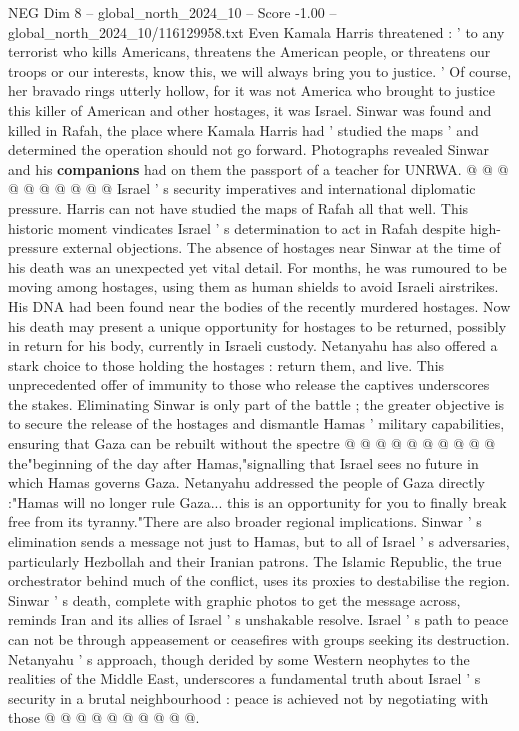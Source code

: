 \begin{textsample}{NEG Dim 8 – global\_north\_2024\_10 – Score -1.00 – global\_north\_2024\_10/116129958.txt}
Even Kamala Harris threatened : ' to any terrorist who kills Americans, threatens the American people, or threatens our troops or our interests, know this, we will always bring you to justice. ' Of course, her bravado rings utterly hollow, for it was not America who brought to justice this killer of American and other hostages, it was Israel.
Sinwar was found and killed in Rafah, the place where Kamala Harris had ' studied the maps ' and determined the operation should not go forward.
Photographs revealed Sinwar and his \textbf{companions} had on them the passport of a teacher for UNRWA. @ @ @ @ @ @ @ @ @ @ Israel ' s security imperatives and international diplomatic pressure.
Harris can not have studied the maps of Rafah all that well.
This historic moment vindicates Israel ' s determination to act in Rafah despite high-pressure external objections.
The absence of hostages near Sinwar at the time of his death was an unexpected yet vital detail.
For months, he was rumoured to be moving among hostages, using them as human shields to avoid Israeli airstrikes.
His DNA had been found near the bodies of the recently murdered hostages.
Now his death may present a unique opportunity for hostages to be returned, possibly in return for his body, currently in Israeli custody.
Netanyahu has also offered a stark choice to those holding the hostages : return them, and live.
This unprecedented offer of immunity to those who release the captives underscores the stakes.
Eliminating Sinwar is only part of the battle ; the greater objective is to secure the release of the hostages and dismantle Hamas ' military capabilities, ensuring that Gaza can be rebuilt without the spectre @ @ @ @ @ @ @ @ @ @ the"beginning of the day after Hamas,"signalling that Israel sees no future in which Hamas governs Gaza.
Netanyahu addressed the people of Gaza directly :"Hamas will no longer rule Gaza... this is an opportunity for you to finally break free from its tyranny."There are also broader regional implications.
Sinwar ' s elimination sends a message not just to Hamas, but to all of Israel ' s adversaries, particularly Hezbollah and their Iranian patrons.
The Islamic Republic, the true orchestrator behind much of the conflict, uses its proxies to destabilise the region.
Sinwar ' s death, complete with graphic photos to get the message across, reminds Iran and its allies of Israel ' s unshakable resolve.
Israel ' s path to peace can not be through appeasement or ceasefires with groups seeking its destruction.
Netanyahu ' s approach, though derided by some Western neophytes to the realities of the Middle East, underscores a fundamental truth about Israel ' s security in a brutal neighbourhood : peace is achieved not by negotiating with those @ @ @ @ @ @ @ @ @ @.

\end{textsample}
